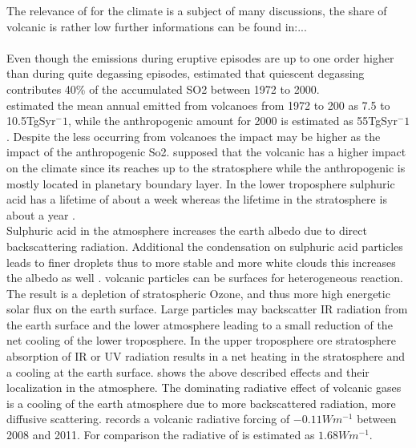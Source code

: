 \documentclass  [
  paper    = a4,
  BCOR     = 10mm,
  twoside,
  fontsize = 12pt,
  fleqn,
  toc      = bibnumbered,
  toc      = listofnumbered,
  numbers  = noendperiod,
  headings = normal,
  listof   = leveldown,
  version  = 3.03
]                                       {scrreprt}
\begin{document}
The relevance of   for the climate is a subject of many discussions, the share of volcanic   is rather low further informations can be found in:...\\\\
Even though the emissions during eruptive episodes are up to one order higher than during quite degassing episodes, \cite{halmer2002annual} estimated that quiescent degassing contributes 40\% of the accumulated SO2 between 1972 to 2000.\\
\cite{halmer2002annual} estimated the mean annual   emitted from volcanoes from 1972 to 200 as 7.5 to 10.5TgSyr$^-1$, while the anthropogenic   amount for 2000 is estimated as 55TgSyr$^-1$ \citep{IPCC}. Despite the less   occurring from volcanoes the impact may be higher as the impact of the anthropogenic So2. \cite{graf1997volcanic} supposed that the volcanic   has a higher impact on the climate since its reaches up to the stratosphere while the anthropogenic   is mostly located in planetary boundary layer. In the lower troposphere sulphuric acid has a lifetime of about a week whereas the lifetime in the stratosphere is about a year \citep{IPCC}.\\
Sulphuric acid in the atmosphere increases the earth albedo due to direct backscattering radiation. Additional the condensation on sulphuric acid particles leads to finer droplets thus to more stable and more white clouds this increases the albedo as well \citep{twomey1974pollution}.
volcanic particles can be surfaces for heterogeneous reaction. The result is a depletion of stratospheric Ozone, and thus more high energetic solar flux on the earth surface.
Large particles may backscatter IR radiation from the earth surface and the lower atmosphere leading to a small reduction of the net cooling of the lower troposphere.
In the upper troposphere ore stratosphere absorption of IR or UV radiation results in a net heating in the stratosphere and a cooling at the earth surface.
 shows the above described effects and their localization in the atmosphere.
The dominating radiative effect of volcanic gases is a cooling of the earth atmosphere due to  more backscattered radiation, more diffusive scattering\citep{robock2000volcanic}.
\cite{IPCC} records a volcanic radiative forcing of $-0.11Wm^{-1}$ between 2008 and 2011. For comparison the radiative of   is estimated as  $1.68Wm^{-1}$.
\end{document}
